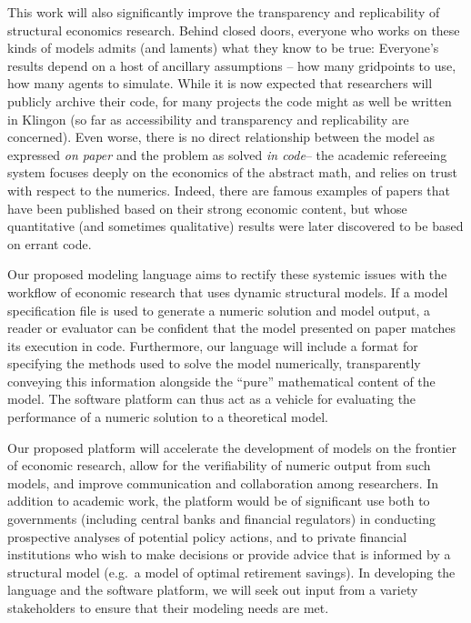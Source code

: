 \documentclass[11pt,pdftex,letterpaper]{article}
\begin{document}
This work will also significantly improve the transparency and replicability of structural economics research. Behind closed doors, everyone who works on these kinds of models admits (and laments) what they know to be true: Everyone's results depend on a host of ancillary assumptions -- how many gridpoints to use, how many agents to simulate.  While it is now expected that researchers will publicly archive their code, for many projects the code might as well be written in Klingon (so far as accessibility and transparency and replicability are concerned).  Even worse, there is no direct relationship between the model as expressed \textit{on paper} and the problem as solved \textit{in code}-- the academic refereeing system focuses deeply on the economics of the abstract math, and relies on trust with respect to the numerics. Indeed, there are famous examples of papers that have been published based on their strong economic content, but whose quantitative (and sometimes qualitative) results were later discovered to be based on errant code.






Our proposed modeling language aims to rectify these systemic issues with the workflow of economic research that uses dynamic structural models. If a model specification file is used to generate a numeric solution and model output, a reader or evaluator can be confident that the model presented on paper matches its execution in code. Furthermore, our language will include a format for specifying the methods used to solve the model numerically, transparently conveying this information alongside the ``pure'' mathematical content of the model. The software platform can thus act as a vehicle for evaluating the performance of a numeric solution to a theoretical model.

Our proposed platform will accelerate the development of models on the frontier of economic research, allow for the verifiability of numeric output from such models, and improve communication and collaboration among researchers. In addition to academic work, the platform would be of significant use both to governments (including central banks and financial regulators) in conducting prospective analyses of potential policy actions, and to private financial institutions who wish to make decisions or provide advice that is informed by a structural model (e.g.\ a model of optimal retirement savings). In developing the language and the software platform, we will seek out input from a variety stakeholders to ensure that their modeling needs are met.
\end{document}
